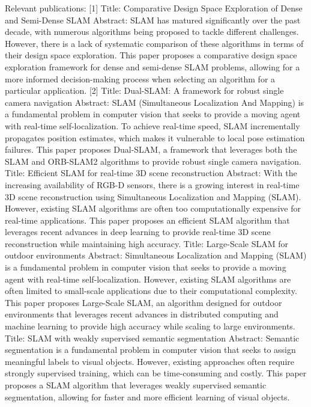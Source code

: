 \documentclass[conference]{IEEEtran}
\begin{document}
Relevant publications:
[1] Title: Comparative Design Space Exploration of Dense and Semi-Dense SLAM
Abstract:   SLAM has matured significantly over the past decade, with numerous algorithms being proposed to tackle different challenges. However, there is a lack of systematic comparison of these algorithms in terms of their design space exploration. This paper proposes a comparative design space exploration framework for dense and semi-dense SLAM problems, allowing for a more informed decision-making process when selecting an algorithm for a particular application.
[2] Title: Dual-SLAM: A framework for robust single camera navigation
Abstract:   SLAM (Simultaneous Localization And Mapping) is a fundamental problem in computer vision that seeks to provide a moving agent with real-time self-localization. To achieve real-time speed, SLAM incrementally propagates position estimates, which makes it vulnerable to local pose estimation failures. This paper proposes Dual-SLAM, a framework that leverages both the SLAM and ORB-SLAM2 algorithms to provide robust single camera navigation.
\cite{unknown00003} Title: Efficient SLAM for real-time 3D scene reconstruction
Abstract:   With the increasing availability of RGB-D sensors, there is a growing interest in real-time 3D scene reconstruction using Simultaneous Localization and Mapping (SLAM). However, existing SLAM algorithms are often too computationally expensive for real-time applications. This paper proposes an efficient SLAM algorithm that leverages recent advances in deep learning to provide real-time 3D scene reconstruction while maintaining high accuracy.
\cite{unknown00004} Title: Large-Scale SLAM for outdoor environments
Abstract:   Simultaneous Localization and Mapping (SLAM) is a fundamental problem in computer vision that seeks to provide a moving agent with real-time self-localization. However, existing SLAM algorithms are often limited to small-scale applications due to their computational complexity. This paper proposes Large-Scale SLAM, an algorithm designed for outdoor environments that leverages recent advances in distributed computing and machine learning to provide high accuracy while scaling to large environments.
\cite{unknown00005} Title: SLAM with weakly supervised semantic segmentation
Abstract:   Semantic segmentation is a fundamental problem in computer vision that seeks to assign meaningful labels to visual objects. However, existing approaches often require strongly supervised training, which can be time-consuming and costly. This paper proposes a SLAM algorithm that leverages weakly supervised semantic segmentation, allowing for faster and more efficient learning of visual objects.
\end{document}
